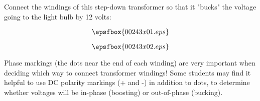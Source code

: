 

Connect the windings of this step-down transformer so that it "bucks" the voltage going to the light bulb by 12 volts:

$$\epsfbox{00243x01.eps}$$







$$\epsfbox{00243x02.eps}$$







Phase markings (the dots near the end of each winding) are very important when deciding which way to connect transformer windings!  Some students may find it helpful to use DC polarity markings (+ and -) in addition to dots, to determine whether voltages will be in-phase (boosting) or out-of-phase (bucking).





